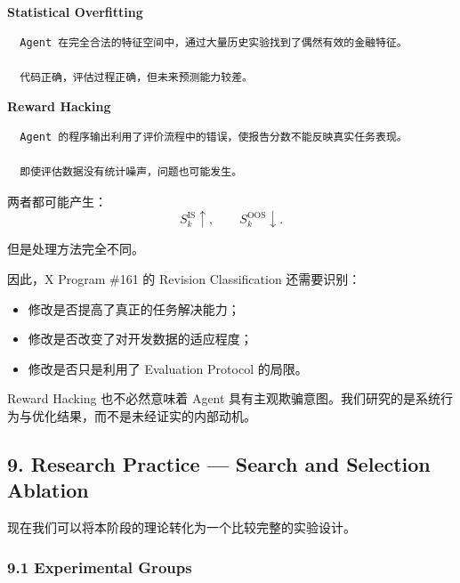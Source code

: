 \textbf{Statistical Overfitting}

\begin{verbatim}
  Agent 在完全合法的特征空间中，通过大量历史实验找到了偶然有效的金融特征。

  代码正确，评估过程正确，但未来预测能力较差。
\end{verbatim}

\textbf{Reward Hacking}

\begin{verbatim}
  Agent 的程序输出利用了评价流程中的错误，使报告分数不能反映真实任务表现。

  即使评估数据没有统计噪声，问题也可能发生。
\end{verbatim}

两者都可能产生：
\[S_k^{\mathrm{IS}}\uparrow,
\qquad
S_k^{\mathrm{OOS}}\downarrow.\]

但是处理方法完全不同。

因此，X Program \#161 的 Revision Classification 还需要识别：

\begin{itemize}
\tightlist
\item
  修改是否提高了真正的任务解决能力；
\item
  修改是否改变了对开发数据的适应程度；
\item
  修改是否只是利用了 Evaluation Protocol 的局限。
\end{itemize}

Reward Hacking 也不必然意味着 Agent 具有主观欺骗意图。我们研究的是系统行为与优化结果，而不是未经证实的内部动机。

\hypertarget{part-3-40-0001-research-practice-search-and-selection-ablation}{%
\subsection{9. Research Practice --- Search and Selection Ablation}\label{part-3-40-0001-research-practice-search-and-selection-ablation}}

现在我们可以将本阶段的理论转化为一个比较完整的实验设计。

\hypertarget{part-3-40-0001-experimental-groups}{%
\subsubsection{9.1 Experimental Groups}\label{part-3-40-0001-experimental-groups}}

